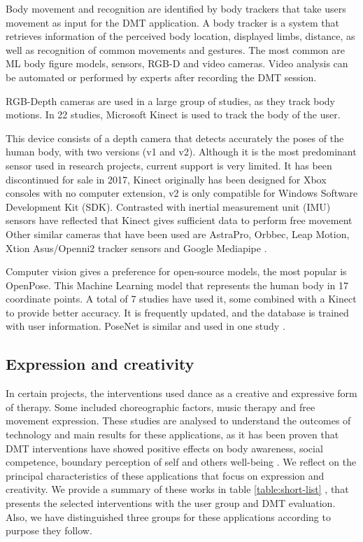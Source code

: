 \documentclass[a4paper,fleqn]{cas-sc}
\begin{document}
Body movement and recognition are identified by body trackers that take users movement as input for the DMT application. A body tracker is a system that retrieves information of the perceived body location, displayed limbs, distance, as well as recognition of common movements and gestures. The most common are ML body figure models, sensors, RGB-D and video cameras. Video analysis can be automated or performed by experts after recording the DMT session.

RGB-Depth cameras are used in a large group of studies, as they track body motions. In 22 studies, Microsoft Kinect is used to track the body of the user. 

This device consists of a depth camera that detects accurately the poses of the human body, with two versions (v1 and v2). Although it is the most predominant sensor used in research projects, current support is very limited. It has been discontinued for sale in 2017, Kinect originally has been designed for Xbox consoles with no computer extension, v2 is only compatible for Windows Software Development Kit (SDK). Contrasted with inertial measurement unit (IMU) sensors have reflected that Kinect gives sufficient data to perform free movement \cite{Geminiani19} 
Other similar cameras that have been used are AstraPro, Orbbec, Leap Motion, Xtion Asus/Openni2 \cite{Chevalier17} tracker sensors and Google Mediapipe \cite{DeCarolis21}.

Computer vision gives a preference for open-source models, the most popular is OpenPose. This Machine Learning model that represents the human body in 17 coordinate points. A total of 7 studies have used it, some combined with a Kinect to provide better accuracy. It is frequently updated, and the database is trained with user information. PoseNet is similar and used in one study \cite{Pohl20}.


\subsection{Expression and creativity}
\label{sec:4-express}
In certain projects, the interventions used dance as a creative and expressive form of therapy. Some included choreographic factors, music therapy and free movement expression. These studies are analysed to understand the outcomes of technology and main results for these applications, as it has been proven that DMT interventions have showed positive effects on body awareness, social competence, boundary perception of self and others well-being \cite{Koch23}. We reflect on the principal characteristics of these applications that focus on expression and creativity. We provide a summary of these works in table \ref{table:short-list} , that presents the selected interventions with the user group and DMT evaluation. Also, we have distinguished three groups for these applications according to purpose they follow.
\end{document}
